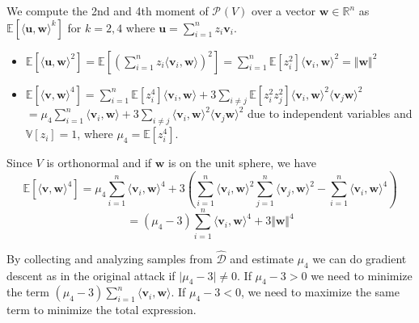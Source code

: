 \documentclass[12 pt]{article}        	%
\newcommand{\PP}[2][]{\mathcal{P}_{#1}(\mat{#2})}
\newcommand{\mat}[1]{\mathit{#1}}
\renewcommand{\vec}[1]{\mathbf{#1}}
\newcommand{\bb}[1]{\mathbb{#1}}
\newcommand{\dgdi}{\widehat{\mathcal{D}}}
\renewcommand{\dot}[2]{\langle \vec{#1}, \vec{#2} \rangle}
\begin{document}
We compute the 2nd and 4th moment of $\PP{V}$ over a vector $\vec{w} \in \bb{R}^n$ as $\bb{E}[\langle \vec{u}, \vec{w} \rangle ^k]$ for $k=2,4$ where $\vec{u} = \sum_{i=1}^{n}z_i \vec{v}_i.$ 
\begin{itemize}
    \item $\bb{E}[\langle \vec{u}, \vec{w} \rangle ^2] = \bb{E}[(\sum_{i=1}^{n} z_i \langle \vec{v}_i, \vec{w} \rangle )^2] = \sum_{i=1}^{n}\bb{E}[z_i^2]\langle \vec{v}_i, \vec{w} \rangle^2 = \Vert \vec{w} \Vert ^2$
    \item $\bb{E}[\dot{v}{w} ^4] = \sum_{i=1}^{n}\bb{E}[z_i ^4] \langle \vec{v}_i, \vec{w} \rangle  + 3\sum_{i \neq j} \bb{E}[z_i^2 z_j^2] \langle \vec{v}_i, \vec{w} \rangle ^2 \langle \vec{v}_j \vec{w} \rangle^2$ \\
        $= \mu_4 \sum_{i=1}^{n} \langle \vec{v}_i, \vec{w} \rangle + 3\sum_{i \neq j} \langle \vec{v}_i, \vec{w} \rangle ^2 \langle \vec{v}_j \vec{w} \rangle^2$
        due to independent variables and $\bb{V}[z_i] = 1$, where $\mu_4 = \bb{E}[z_i ^4]$.
\end{itemize}
Since $\mat{V}$ is orthonormal and if $\vec{w}$ is on the unit sphere, we have 
\[\bb{E}[\dot{v}{w} ^4] = \mu_4 \sum_{i=1}^{n} \langle \vec{v}_i, \vec{w} \rangle ^4 + 3(\sum_{i=1}^{n} \langle \vec{v}_i, \vec{w} \rangle^2 \sum_{j=1}^{n} \langle \vec{v}_j, \vec{w} \rangle^2 - \sum_{i=1}^{n} \langle \vec{v}_i, \vec{w} \rangle ^4)\]
\[= (\mu_4 - 3)\sum_{i=1}^{n}\langle \vec{v}_i, \vec{w} \rangle^4 + 3 \Vert \vec{w} \Vert ^4\]

By collecting and analyzing samples from $\dgdi$ and estimate $\mu_4$ we can do gradient descent as in the original attack if $\lvert \mu_4 - 3 \rvert \neq 0$.
If $\mu_4 - 3 > 0$ we need to minimize the term $(\mu_4 - 3) \sum_{i=1}^{n} \langle \vec{v}_i, \vec{w} \rangle$. If $\mu_4 - 3 < 0$, we need to maximize the same term to minimize the total expression.
\end{document}
